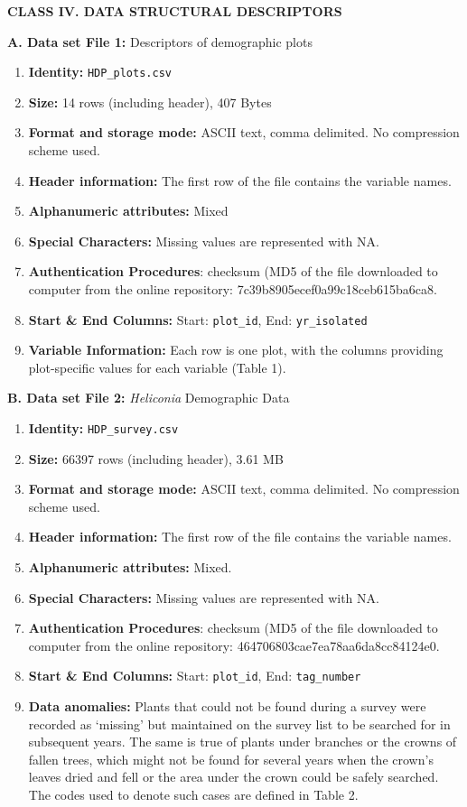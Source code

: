 \documentclass[
  12pt,
  man, donotrepeattitle,floatsintext]{apa6}
\begin{document}
\noindent  
\textbf{CLASS IV. DATA STRUCTURAL DESCRIPTORS}

\noindent  
\textbf{A. Data set File 1:} Descriptors of demographic plots

\begin{enumerate}
\def\labelenumi{\arabic{enumi}.}
\item
  \textbf{Identity:} \texttt{HDP\_plots.csv}
\item
  \textbf{Size:} 14 rows (including header), 407 Bytes
\item
  \textbf{Format and storage mode:} ASCII text, comma delimited. No
  compression scheme used.
\item
  \textbf{Header information:} The first row of the file contains the variable names.
\item
  \textbf{Alphanumeric attributes:} Mixed
\item
  \textbf{Special Characters:} Missing values are represented with NA.
\item
  \textbf{Authentication Procedures}: checksum (MD5 of the file downloaded to computer from the online repository: 7c39b8905ecef0a99c18ceb615ba6ca8.
\item
  \textbf{Start \& End Columns:} Start: \texttt{plot\_id}, End: \texttt{yr\_isolated}
\item
  \textbf{Variable Information:} Each row is one plot, with the columns providing plot-specific values for each variable (Table 1).
\end{enumerate}

\noindent 
\textbf{B. Data set File 2:} \emph{Heliconia} Demographic Data

\begin{enumerate}
\def\labelenumi{\arabic{enumi}.}
\item
  \textbf{Identity:} \texttt{HDP\_survey.csv}
\item
  \textbf{Size:} 66397 rows (including header), 3.61 MB
\item
  \textbf{Format and storage mode:} ASCII text, comma delimited. No compression scheme used.
\item
  \textbf{Header information:} The first row of the file contains the variable names.
\item
  \textbf{Alphanumeric attributes:} Mixed.
\item
  \textbf{Special Characters:} Missing values are represented with NA.
\item
  \textbf{Authentication Procedures}: checksum (MD5 of the file downloaded to computer from the online repository: 464706803cae7ea78aa6da8cc84124e0.
\item
  \textbf{Start \& End Columns:} Start: \texttt{plot\_id}, End: \texttt{tag\_number}
\item
  \textbf{Data anomalies:} Plants that could not be found during a survey were recorded as `missing' but maintained on the survey list to be searched for in subsequent years. The same is true of plants under branches or the crowns of fallen trees, which might not be found for several years when the crown's leaves dried and fell or the area under the crown could be safely searched. The codes used to denote such cases are defined in Table 2.
\end{enumerate}
\end{document}
